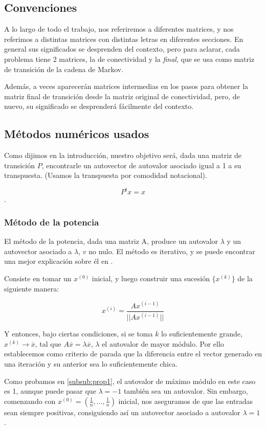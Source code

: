 \subsection{Convenciones}

A lo largo de todo el trabajo, nos referiremos a diferentes matrices, y nos referimos a distintas matrices con distintas letras en diferentes secciones. En general sus significados se desprenden del contexto, pero para aclarar, cada problema tiene 2 matrices, la de conectividad y la \emph{final}, que se usa como matriz de transición de la cadena de Markov.

Además, a veces aparecerán matrices intermedias en los pasos para obtener la matriz final de transición desde la matriz original de conectividad, pero, de nuevo, su significado se desprenderá fácilmente del contexto.


\subsection{Métodos numéricos usados}

Como dijimos en la introducción, nuestro objetivo será, dada una matriz de transición $P$, encontrarle un autovector de autovalor asociado igual a 1 a su transpuesta. (Usamos la transpuesta por comodidad notacional).

\[P^t x = x\].


\subsubsection{Método de la potencia}
El método de la potencia, dada una matriz A, produce un autovalor $\lambda$ y un autovector asociado a $\lambda$, $v$ no nulo. El método es iterativo, y se puede encontrar una mejor explicación sobre él en \cite[Cap. 5.8.1]{dahlquist}. 

Consiste en tomar un $x^{(0)}$ inicial, y luego construir una sucesión $\{x^{(k)}\}$ de la siguiente manera:

\[x^{(i)} = \frac{A x^{(i-1)}}{||A x^{(i-1)}||}\]

Y entonces, bajo ciertas condiciones, si se toma $k$ lo suficientemente grande, $x^{(k)} \to \overline{x}$, tal que $A\overline{x} = \lambda \overline{x}$, $\lambda$ el autovalor de mayor módulo. Por ello establecemos como criterio de parada que la diferencia entre el vector generado en una iteración y su anterior sea lo suficientemente chica.

Como probamos en \ref{subsub:prop1}, el autovalor de máximo módulo en este caso es 1, aunque puede pasar que $\lambda = -1$ también sea un autovalor. Sin embargo, comenzando con $x^{(0)} = (\frac1n,..., \frac1n)$ inicial, nos aseguramos de que las entradas sean siempre positivas, consiguiendo así un autovector asociado a autovalor $\lambda = 1$.


